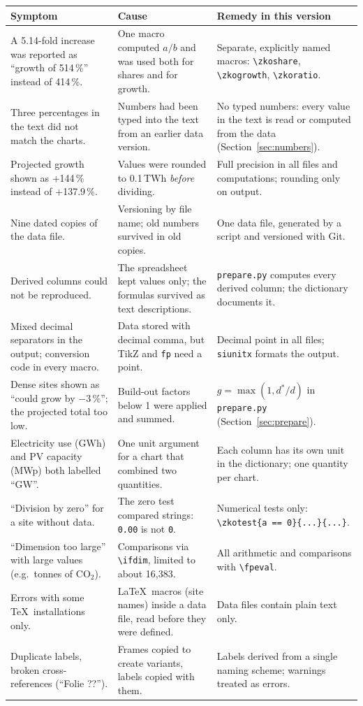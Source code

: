 \documentclass[11pt,a4paper]{article}
\begin{document}
{\small
\begin{longtable}{@{}p{4.6cm}p{5.2cm}p{5.2cm}@{}}
\toprule
Symptom & Cause & Remedy in this version \\
\midrule
\endhead
A 5.14-fold increase was reported as ``growth of 514\,\%'' instead of 414\,\%. &
One macro computed $a/b$ and was used both for shares and for growth. &
Separate, explicitly named macros: \verb|\zkoshare|, \verb|\zkogrowth|,
\verb|\zkoratio|. \\
\addlinespace
Three percentages in the text did not match the charts. &
Numbers had been typed into the text from an earlier data version. &
No typed numbers: every value in the text is read or computed from the data
(Section~\ref{sec:numbers}). \\
\addlinespace
Projected growth shown as +144\,\% instead of +137.9\,\%. &
Values were rounded to 0.1\,TWh \emph{before} dividing. &
Full precision in all files and computations; rounding only on output. \\
\addlinespace
Nine dated copies of the data file. &
Versioning by file name; old numbers survived in old copies. &
One data file, generated by a script and versioned with Git. \\
\addlinespace
Derived columns could not be reproduced. &
The spreadsheet kept values only; the formulas survived as text descriptions. &
\texttt{prepare.py} computes every derived column; the dictionary documents it. \\
\addlinespace
Mixed decimal separators in the output; conversion code in every macro. &
Data stored with decimal comma, but TikZ and \texttt{fp} need a point. &
Decimal point in all files; \texttt{siunitx} formats the output. \\
\addlinespace
Dense sites shown as ``could grow by $-3\,\%$''; the projected total too low. &
Build-out factors below 1 were applied and summed. &
$g = \max(1, d^\ast/d)$ in \texttt{prepare.py} (Section~\ref{sec:prepare}). \\
\addlinespace
Electricity use (GWh) and PV capacity (MWp) both labelled ``GW''. &
One unit argument for a chart that combined two quantities. &
Each column has its own unit in the dictionary; one quantity per chart. \\
\addlinespace
``Division by zero'' for a site without data. &
The zero test compared strings: \texttt{0.00} is not \texttt{0}. &
Numerical tests only: \verb|\zkotest{a == 0}{...}{...}|. \\
\addlinespace
``Dimension too large'' with large values (e.g.\ tonnes of CO$_2$). &
Comparisons via \verb|\ifdim|, limited to about 16,383. &
All arithmetic and comparisons with \verb|\fpeval|. \\
\addlinespace
Errors with some \TeX\ installations only. &
\LaTeX\ macros (site names) inside a data file, read before they were defined. &
Data files contain plain text only. \\
\addlinespace
Duplicate labels, broken cross-references (``Folie ??''). &
Frames copied to create variants, labels copied with them. &
Labels derived from a single naming scheme; warnings treated as errors. \\
\bottomrule
\end{longtable}}
\end{document}

